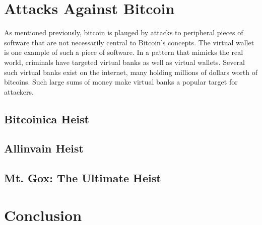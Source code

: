 \documentclass{report}
\begin{document}
\section*{Attacks Against Bitcoin}
As mentioned previously, bitcoin is plauged by attacks to peripheral pieces of software 
that are not necessarily central to Bitcoin's concepts.  The virtual wallet is one example
of such a piece of software.  In a pattern that mimicks the real world, criminals have
targeted virtual banks as well as virtual wallets.  Several such virtual banks exist on
the internet, many holding millions of dollars worth of bitcoins.  Such large sums of 
money make virtual banks a popular target for attackers.

\subsection*{Bitcoinica Heist}

\subsection*{Allinvain Heist}
\subsection*{Mt. Gox: The Ultimate Heist}

\section*{Conclusion}

{}

\end{document}
